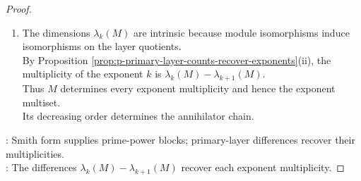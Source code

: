 \begin{theorem}
\begin{proof}
\begin{enumerate}[label=(\roman*)]
\begin{enumerate}[label=(\alph*)]
\item {}: Set $C\defeq\bigoplus\limits_{i=1}^mR/\langle p^{e_i}\rangle$. Since $\langle d_i\rangle=\langle p^{e_i}\rangle$, choose an isomorphism $\Psi:C\to M$.\\
Let $\mathbf{u}_i$ be the standard generator of the $i$th coordinate summand and set $v_i\defeq\Psi(\mathbf{u}_i)$.\\
Since $\Psi$ is an isomorphism, $M=\bigoplus\limits_{i=1}^m\langle\!\langle v_i\rangle\!\rangle_R$. The standard generator of $R/\langle p^{e_i}\rangle$ has annihilator $\langle p^{e_i}\rangle$.\\
An isomorphism preserves annihilators, so $\operatorname{Ann}_R(v_i)=\langle p^{e_i}\rangle$.
\end{enumerate}
\item The dimensions $\lambda_k(M)$ are intrinsic because module isomorphisms induce isomorphisms on the layer quotients.\\
By Proposition \ref{prop:p-primary-layer-counts-recover-exponents}(ii), the multiplicity of the exponent $k$ is $\lambda_k(M)-\lambda_{k+1}(M)$.\\
Thus $M$ determines every exponent multiplicity and hence the exponent multiset.\\
Its decreasing order determines the annihilator chain.
\end{enumerate}
\noindent
{}: Smith form supplies prime-power blocks; primary-layer differences recover their multiplicities.\\
: The differences $\lambda_k(M)-\lambda_{k+1}(M)$ recover each exponent multiplicity.
\end{proof}
\end{theorem}

